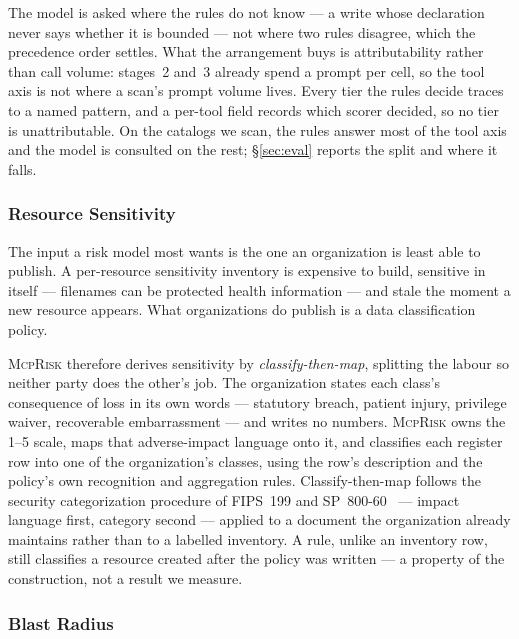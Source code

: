 \documentclass[sigconf]{acmart}
\newcommand{\framework}{\textsc{McpRisk}}
\begin{document}
The model is asked where the rules do not know --- a write whose declaration
never says whether it is bounded --- not where two rules disagree, which the
precedence order settles. What the
arrangement buys is attributability rather than call volume: stages~2 and~3
already spend a prompt per cell, so the tool axis is not where a scan's prompt
volume lives. Every tier the rules decide traces to a named pattern, and a per-tool
field records which scorer decided, so no tier is unattributable. On the
catalogs we scan, the rules answer most of the tool axis and the model is
consulted on the rest; \S\ref{sec:eval} reports the split and where it falls.

\subsubsection{Resource Sensitivity}
\label{sec:sensitivity}

The input a risk model most wants is the one an organization is least able to
publish. A per-resource sensitivity inventory is expensive to build, sensitive
in itself --- filenames can be protected health information --- and stale the
moment a new resource appears. What organizations do publish is a data
classification policy.

\framework{} therefore derives sensitivity by \emph{classify-then-map},
splitting the labour so neither party does the other's job. The organization
states each class's consequence of loss in its own words ---
statutory breach, patient injury, privilege waiver, recoverable embarrassment
--- and writes no numbers. \framework{} owns the 1--5 scale, maps that
adverse-impact language onto it, and classifies each register row into one of
the organization's classes, using the row's description and the policy's own
recognition and aggregation rules. Classify-then-map follows the security
categorization procedure of FIPS~199 and
SP~800-60~\cite{nist2004fips199,nist2008sp80060} --- impact language first,
category second --- applied to a document the organization already maintains
rather than to a labelled inventory. A rule, unlike an inventory row, still
classifies a resource created after the policy was written --- a property of
the construction, not a result we measure.

\subsubsection{Blast Radius}
\label{sec:blast}
\end{document}
